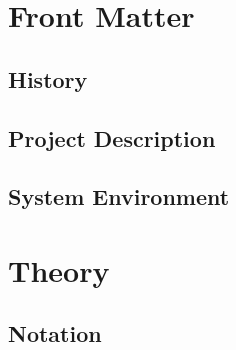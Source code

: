 \part{Front Matter}

	\chapter{History}
	

	\chapter{Project Description}
	

	\chapter{System Environment}
	

\part{Theory}

	\chapter{Notation}
	

